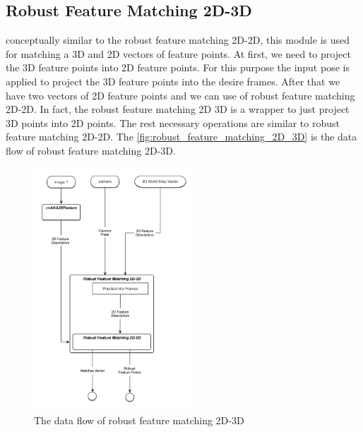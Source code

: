 \subsection {Robust Feature Matching 2D-3D} \label{subsec:robust_feature_matching_2D_3D}
conceptually similar to the robust feature matching 2D-2D, this module is used for matching a 3D and 2D vectors of feature points. At first, we need to project the 3D feature points into 2D feature points. For this purpose the input pose is applied to project the 3D feature points into the desire frames. After that we have two vectors of 2D feature points and we can use of robust feature matching 2D-2D. In fact, the robust feature matching 2D 3D is a wrapper to just project 3D points into 2D points. The rest necessary operations are similar to robust feature matching 2D-2D. The \autoref{fig:robust_feature_matching_2D_3D} is the data flow of robust feature matching 2D-3D.
\begin{figure}[H]
  \centering
  \includegraphics[width=60mm]{figures/robust_feature_matching_2D_3D}
  \caption{The data flow of robust feature matching 2D-3D}\label{fig:robust_feature_matching_2D_3D}
\end{figure}

